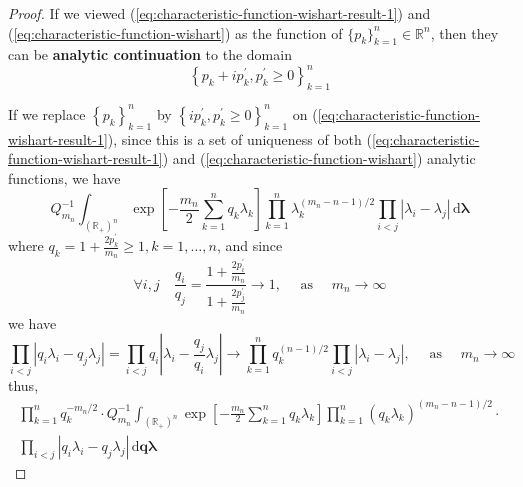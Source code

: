 \begin{proof}
    If we viewed (\ref{eq:characteristic-function-wishart-result-1}) and (\ref{eq:characteristic-function-wishart}) as the function of $\{p_{k}\}_{k=1}^{n}\in\mathbb{R}^{n}$, then they can be \textbf{analytic continuation} to the domain
    \begin{equation*}
        \left\{p_{k}+i p_{k}^{\prime},p_{k}^{\prime}\geq 0\right\}_{k=1}^{n}
    \end{equation*}

    If we replace $\left\{p_{k}\right\}_{k=1}^{n}$ by $\left\{ip_{k}^{\prime},p_{k}^{\prime}\geq 0\right\}_{k=1}^{n}$ on (\ref{eq:characteristic-function-wishart-result-1}), since this is a set of uniqueness of both (\ref{eq:characteristic-function-wishart-result-1}) and (\ref{eq:characteristic-function-wishart}) analytic functions, we have
    \begin{equation*}
        Q_{m_{n}}^{-1}\int_{\left(\mathbb{R}_{+}\right)^{n}}\exp\left[-\frac{m_{n}}{2}\sum_{k=1}^{n}q_{k}\lambda_{k}\right]\prod_{k=1}^{n}\lambda_{k}^{(m_{n}-n-1)/2}\prod_{i<j}\left|\lambda_{i}-\lambda_{j}\right|\,\mathrm{d}\boldsymbol{\lambda}
    \end{equation*}
    where $q_{k}=1+\frac{2p_{k}^{\prime}}{m_{n}}\geq 1,k=1,\ldots,n$, and since
    \begin{equation*}
        \forall i,j\quad\frac{q_{i}}{q_{j}}=\frac{1+\frac{2p_{i}^{\prime}}{m_{n}}}{1+\frac{2p_{j}^{\prime}}{m_{n}}}\rightarrow 1,\quad\text{ as }\quad m_{n}\rightarrow\infty
    \end{equation*}
    we have
    \begin{equation*}
        \prod_{i<j}\left|q_{i}\lambda_{i}-q_{j}\lambda_{j}\right|=\prod_{i<j}q_{i}\left|\lambda_{i}-\frac{q_{j}}{q_{i}}\lambda_{j}\right|\rightarrow\prod_{k=1}^{n}q_{k}^{(n-1)/2}\prod_{i<j}\left|\lambda_{i}-\lambda_{j}\right|,\quad\text{ as }\quad m_{n}\rightarrow\infty
    \end{equation*}
    thus,
    \begin{equation*}
        \begin{array}{c}
            \prod_{k=1}^{n}q_{k}^{-m_{n}/2}\cdot Q_{m_{n}}^{-1}\int_{\left(\mathbb{R}_{+}\right)^{n}}\exp\left[-\frac{m_{n}}{2}\sum_{k=1}^{n}q_{k}\lambda_{k}\right]\prod_{k=1}^{n}\left(q_{k}\lambda_{k}\right)^{(m_{n}-n-1)/2}\cdot \\
            \prod_{i<j}\left|q_{i}\lambda_{i}-q_{j}\lambda_{j}\right|\,\mathrm{d}\mathbf{q}\boldsymbol{\lambda}
        \end{array}
    \end{equation*}

\end{proof}
